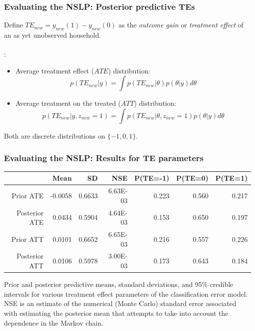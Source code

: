 \documentclass[xcolor=dvipsnames]{beamer}
\begin{document}
\begin{frame}
    \frametitle{Evaluating the NSLP: Posterior predictive TEs}
Define $TE_{new}=y_{new}(1) - y_{new}(0)$ as the {\it outcome gain} or {\it treatment effect} of an as yet unobserved household.\\~\\

\cite{poirier2003predictive}:
\begin{itemize}
\item[] Average treatment effect ($ATE$) distribution: 
  \[
  p(TE_{new}|y) = \int p(TE_{new}|\theta)p(\theta|y)d\theta
  \]
\item[] Average treatment on the treated ($ATT$) distribution: 
  \[
  p(TE_{new}|y,z_{new}=1) = \int p(TE_{new}|\theta, z_{new}=1)p(\theta|y)d\theta
  \]
\end{itemize}
Both are discrete distributions on $\{-1,0,1\}$.
\end{frame}



\begin{frame}[fragile]
\frametitle{Evaluating the NSLP: Results for TE parameters}
  
\begin{table}[ht]
\centering
{\footnotesize
\begin{tabular}{|r|rrr|rrr|}
  \hline
 & Mean & SD & NSE & P(TE=-1) & P(TE=0) & P(TE=1) \\ 
  \hline
Prior ATE & -0.0058 & 0.6633 & 6.63E-03 & 0.223 & 0.560 & 0.217 \\ 
  Posterior ATE & 0.0434 & 0.5904 & 4.64E-03 & 0.153 & 0.650 & 0.197 \\ 
  Prior ATT & 0.0101 & 0.6652 & 6.65E-03 & 0.216 & 0.557 & 0.226 \\ 
  Posterior ATT & 0.0106 & 0.5978 & 3.00E-03 & 0.173 & 0.643 & 0.184 \\ 
   \hline
\end{tabular}
}
\end{table}
{\footnotesize Prior and posterior predictive means, standard deviations, and 95\% credible intervals for various treatment effect parameters of the classification error model. NSE is an estimate of the numerical (Monte Carlo) standard error associated with estimating the posterior mean that attempts to take into account the dependence in the Markov chain.}
\end{frame}
\end{document}
